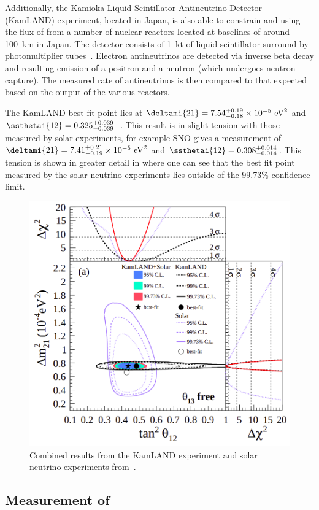 Additionally, the Kamioka Liquid Scintillator Antineutrino Detector (KamLAND) experiment, located in Japan, is also able to constrain  and  using the flux of \anue from a number of nuclear reactors located at baselines of around 100~km in Japan.
The detector consists of 1~kt of liquid scintillator surround by photomultiplier tubes~\cite{kamland}.
Electron antineutrinos are detected via inverse beta decay and resulting emission of a positron and a neutron (which undergoes neutron capture).
The measured rate of antineutrinos is then compared to that expected based on the output of the various reactors.

The KamLAND best fit point lies at $\deltami{21} = 7.54^{+0.19}_{-0.18} \times 10^{-5}~\text{eV}^{2}$ and $\ssthetai{12}=0.325^{+0.039}_{-0.039}$~\cite{kamland}.
This result is in slight tension with those measured by solar experiments, for example SNO gives a measurement of $\deltami{21}=7.41^{+0.21}_{-0.19} \times 10^{-5}~\text{eV}^{2}$ and $\ssthetai{12}=0.308^{+0.014}_{-0.014}$.
This tension is shown in greater detail in  where one can see that the best fit point measured by the solar neutrino experiments lies outside of the 99.73\% confidence limit.

\begin{figure}[h]
  \centering
  \includegraphics[width=.7\linewidth]{files/figures/theory/kamlandPlusSolar}
  \caption[Combined limits from the KamLAND experiment and solar neutrino experiments.]{Combined results from the KamLAND experiment and solar neutrino experiments from~\cite{kamland}.}
  \label{fig:kamlandPlusSolar}
\end{figure}

\subsection{Measurement of }
\label{sec:theory:currentState:theta13}

